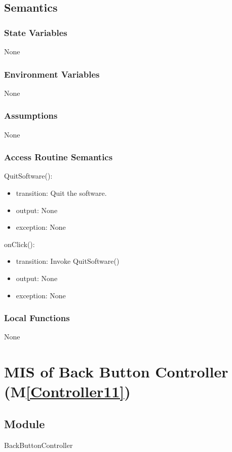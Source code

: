 \documentclass[12pt, titlepage]{article}
\newcommand{\mref}[1]{M\ref{#1}}
\begin{document}
\subsection{Semantics}
\subsubsection{State Variables}
None

\subsubsection{Environment Variables}
None

\subsubsection{Assumptions}
None

\subsubsection{Access Routine Semantics}
QuitSoftware():
\begin{itemize}
\item transition: Quit the software.
\item output: None
\item exception: None
\end{itemize}
onClick():
\begin{itemize}
\item transition: Invoke QuitSoftware()
\item output: None
\item exception: None
\end{itemize}
\subsubsection{Local Functions}
None
\newpage



\newpage

\section{MIS of Back Button Controller (\mref{Controller11})}  

\subsection{Module}
BackButtonController
\end{document}

